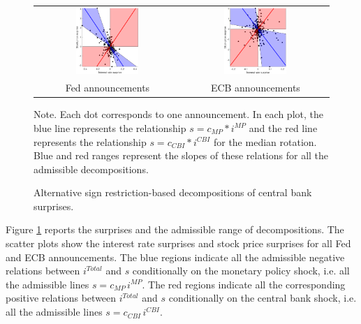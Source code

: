 \documentclass[a4paper,12pt]{article}
\begin{document}
\begin{figure}[!htbp]
\caption{Alternative sign restriction-based decompositions of central bank surprises.}\label{fig: rotation extremes}
\begin{center}
\begin{tabular}{cc}
\includegraphics[width=0.45\textwidth]{figures/fed-scatter-rotations}&
\includegraphics[width=0.45\textwidth]{figures/ecb-scatter-rotations}\\
Fed announcements & ECB announcements
\end{tabular}
\end{center}
\footnotesize Note. Each dot corresponds to one announcement. In each plot, the blue line represents the relationship $s = c_{MP}* i^{MP}$ and the red line represents the relationship 
$s = c_{CBI}* i^{CBI}$ for the median rotation. Blue and red ranges represent the slopes of these relations for all the admissible decompositions.
\end{figure}

Figure \ref{fig: rotation extremes} reports the surprises and the admissible range of decompositions.
The scatter plots show the interest rate surprises and stock price
surprises for all Fed and ECB announcements.
The blue regions indicate all the admissible negative relations between $i^{Total}$ and $s$ conditionally on
the monetary policy shock, i.e. all the admissible lines  $s = c_{MP}\,i^{MP}$. 
The red regions indicate all the corresponding positive relations between $i^{Total}$ and $s$ conditionally on
the central bank shock, i.e. all the admissible lines  $s = c_{CBI}\,i^{CBI}$. 
\end{document}
